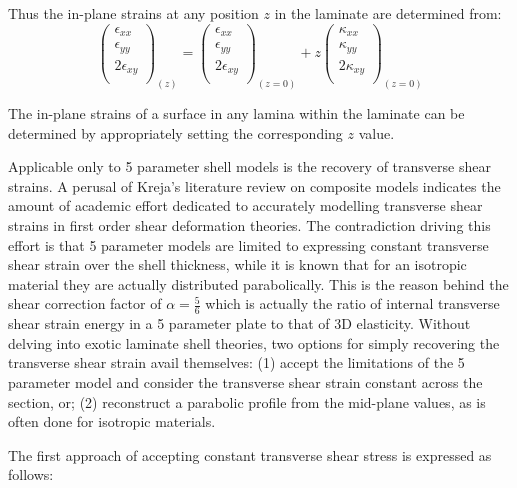 Thus the in-plane strains at any position $z$ in the laminate are determined from:
\begin{equation} 
\begin{pmatrix}
\epsilon_{xx} \\
\epsilon_{yy} \\
2\epsilon_{xy}\\
\end{pmatrix}_{(z)}
=
\begin{pmatrix}
\epsilon_{xx} \\
\epsilon_{yy} \\
2\epsilon_{xy}\\
\end{pmatrix}_{(z=0)}
+
z
\begin{pmatrix}
\kappa_{xx}\\
\kappa_{yy}\\
2\kappa_{xy} \\
\end{pmatrix}_{(z=0)}
\label{eqscomp_strain_recovery2}
\end{equation}

The in-plane strains of a surface in any lamina within the laminate can be determined by appropriately setting the corresponding $z$ value.

Applicable only to 5 parameter shell models is the recovery of transverse shear strains. A perusal of Kreja's literature review on composite models \cite{kreja2011literature} indicates the amount of academic effort dedicated to accurately modelling transverse shear strains in first order shear deformation theories. The contradiction driving this effort is that 5 parameter models are limited to expressing constant transverse shear strain over the shell thickness, while it is known that for an isotropic material they are actually distributed parabolically. This is the reason behind the shear correction factor of $\alpha = \frac{5}{6}$ which is actually the ratio of internal transverse shear strain energy in a 5 parameter plate to that of 3D elasticity. Without delving into exotic laminate shell theories, two options for simply recovering the transverse shear strain avail themselves: (1) accept the limitations of the 5 parameter model and consider the transverse shear strain constant across the section, or; (2) reconstruct a parabolic profile from the mid-plane values, as is often done for isotropic materials.

The first approach of accepting constant transverse shear stress is expressed as follows:

